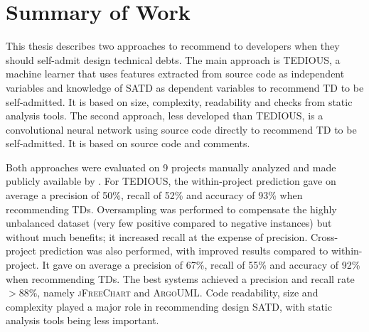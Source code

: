 \label{sec:Conclusion}





\section{Summary of Work}


This thesis describes two approaches to recommend to developers when they should self-admit design technical debts. The main approach is TEDIOUS, a machine learner that uses features extracted from source code as independent variables and knowledge of SATD as dependent variables to recommend TD to be self-admitted. It is based on size, complexity, readability and checks from static analysis tools. The second approach, less developed than TEDIOUS, is a convolutional neural network using source code directly to recommend TD to be self-admitted. It is based on source code and comments.

Both approaches were evaluated on 9 projects manually analyzed and made publicly available by \citet{maldonado17}. For TEDIOUS, the within-project prediction gave on average a precision of 50\%, recall of 52\% and accuracy of 93\% when recommending TDs. Oversampling was performed to compensate the highly unbalanced dataset (very few positive compared to negative instances) but without much benefits; it increased recall at the expense of precision. Cross-project prediction was also performed, with improved results compared to within-project. It gave on average a precision of 67\%, recall of 55\% and accuracy of 92\% when recommending TDs. The best systems achieved a precision and recall rate $> 88\%$, namely \textsc{jFreeChart} and \textsc{ArgoUML}. Code readability, size and complexity played a major role in recommending design SATD, with static analysis tools being less important.

